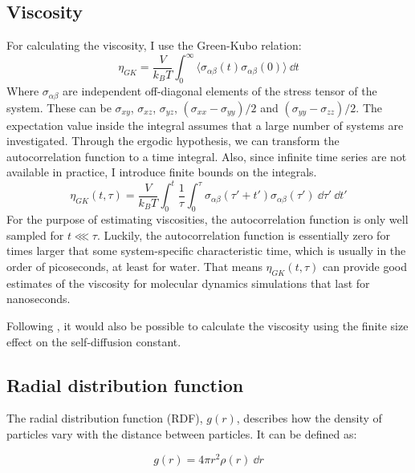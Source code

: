 \subsection{Viscosity}
For calculating the viscosity, I use the Green-Kubo relation:
\begin{equation}
	\eta_{GK} = \frac{V}{k_B T} \int_0^\infty \langle \sigma_{\alpha\beta}(t) \sigma_{\alpha\beta}(0) \rangle\ \dd t
	\label{eq:GK_shear_viscosity}
\end{equation}
Where $\sigma_{\alpha\beta}$ are independent off-diagonal elements of the stress tensor of the system. These can be $\sigma_{xy}$, $\sigma_{xz}$, $\sigma_{yz}$, $(\sigma_{xx}-\sigma_{yy})/2$ and $(\sigma_{yy}-\sigma_{zz})/2$. The expectation value inside the integral assumes that a large number of systems are investigated. Through the ergodic hypothesis, we can transform the autocorrelation function to a time integral. Also, since infinite time series are not available in practice, I introduce finite bounds on the integrals. 
\begin{equation}
	\eta_{GK}(t, \tau) = \frac{V}{k_B T} \int_0^t  \frac{1}{\tau} \int_0^\tau \sigma_{\alpha\beta}(\tau'+t') \sigma_{\alpha\beta}(\tau')\ \dd \tau'\ \dd t' 
\label{eq:GK_shear_viscosity_estimate}
\end{equation}
For the purpose of estimating viscosities, the autocorrelation function is only well sampled for $t \lll \tau$. Luckily, the autocorrelation function is essentially zero for times larger that some system-specific characteristic time, which is usually in the order of picoseconds, at least for water. That means $\eta_{GK}(t, \tau)$ can provide good estimates of the viscosity for molecular dynamics simulations that last for nanoseconds.


Following \cite{Yeh2004}, it would also be possible to calculate the viscosity using the finite size effect on the self-diffusion constant.

\subsection{Radial distribution function}
The radial distribution function (RDF), $g(r)$, describes how the density of particles vary with the distance between particles. It can be defined as:

\begin{equation}
	g(r) = 4\pi r^2 \rho(r) \ \dd r
\end{equation}

